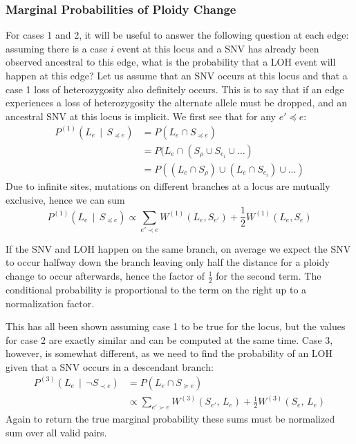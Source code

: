 \documentclass[../../main.tex]{subfiles}
\begin{document}
\subsubsection*{Marginal Probabilities of Ploidy Change}

For cases 1 and 2, it will be useful to answer the following question at each edge: assuming there is a case $i$ event at this locus and a SNV has already been observed ancestral to this edge, what is the probability that a LOH event will happen at this edge?
Let us assume that an SNV occurs at this locus and that a case 1 loss of heterozygosity also definitely occurs.
This is to say that if an edge experiences a loss of heterozygosity the alternate allele must be dropped, and an ancestral SNV at this locus is implicit. 
We first see that for any $e'\preceq e$: 
\begin{align*}
    P^{(1)}(L_e\,\mid\,S_{\preceq e}) &= P(L_e\cap S_{\preceq e})\\
    &= P(L_e\cap(S_\rho \cup S_{e_i} \cup \dots)\\
    &= P((L_e\cap S_\rho) \cup (L_e\cap S_{e_i}) \cup \dots)
\end{align*}
Due to infinite sites, mutations on different branches at a locus are mutually exclusive, hence we can sum
\begin{equation*}
    P^{(1)}(L_e\,\mid\,S_{\preceq e}) \propto \sum_{e'\prec e}W^{(1)}(L_e, S_{e'}) + \frac{1}{2} W^{(1)}(L_e, S_e)
\end{equation*}

If the SNV and LOH happen on the same branch, on average we expect the SNV to occur halfway down the branch leaving only half the distance for a ploidy change to occur afterwards, hence the factor of $\frac{1}{2}$ for the second term.
The conditional probability is proportional to the term on the right up to a normalization factor.

This has all been shown assuming case 1 to be true for the locus, but the values for case 2 are exactly similar and can be computed at the same time.
Case 3, however, is somewhat different, as we need to find the probability of an LOH given that a SNV occurs in a descendant branch:
\begin{align*}
    P^{(3)}(L_e\,\mid\,\neg S_{\prec e}) &= P(L_e\cap S_{\succeq e})\\
    &\propto \sum_{e'\succ e}W^{(3)}(S_{e'},\,L_e) + \frac{1}{2}W^{(3)}(S_e,\,L_e)
\end{align*}
Again to return the true marginal probability these sums must be normalized sum over all valid pairs.
\end{document}
